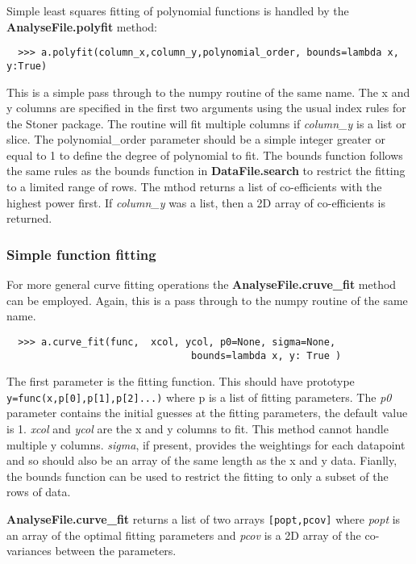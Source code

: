 \documentclass[a4paper,11pt]{scrartcl}
\begin{document}
Simple least squares fitting of polynomial functions is handled by the
\textbf{AnalyseFile.polyfit} method:

\begin{verbatim}
  >>> a.polyfit(column_x,column_y,polynomial_order, bounds=lambda x, y:True)
\end{verbatim}

This is a simple pass through to the numpy routine of the same name. The x and y
columns are specified in the first two arguments using the usual index rules for
the Stoner package. The routine will fit multiple columns if \textit{column\_y}
is a list or slice. The polynomial\_order parameter should be a simple integer
greater or equal to 1 to define the degree of polynomial to fit. The bounds
function follows the same rules as the bounds function in
\textbf{DataFile.search} to restrict the fitting to a limited range of rows. The
mthod returns a list of co-efficients with the highest power first. If
\textit{column\_y} was a list, then a 2D array of co-efficients is returned.

\subsubsection{Simple function fitting}

For more general curve fitting operations the \textbf{AnalyseFile.cruve\_fit}
method can be employed. Again, this is a pass through to the numpy routine of
the same name.

\begin{verbatim}
  >>> a.curve_fit(func,  xcol, ycol, p0=None, sigma=None,
                                bounds=lambda x, y: True )
\end{verbatim}

The first parameter is the fitting function. This should have prototype
\\\verb:y=func(x,p[0],p[1],p[2]...): where p is a list of fitting parameters.
The \textit{p0} parameter contains the initial guesses at the fitting
parameters, the default value is 1. \textit{xcol} and \textit{ycol} are the x
and y columns to fit. This method cannot handle multiple y columns.
\textit{sigma}, if present, provides the weightings for each datapoint and so
should also be an array of the same length as the x and y data. Fianlly, the
bounds function can be used to restrict the fitting to only a subset of the rows
of data.

\textbf{AnalyseFile.curve\_fit} returns a list of two arrays \verb:[popt,pcov]:
where \textit{popt} is an array of the optimal fitting parameters and
\textit{pcov} is a 2D array of the co-variances between the parameters.
\end{document}
